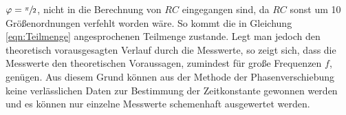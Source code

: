 $\varphi = \sfrac{\pi}{2}$, nicht in die Berechnung von $RC$ eingegangen sind, da $RC$ sonst um 10 Größenordnungen verfehlt worden wäre.
So kommt die in Gleichung \eqref{eqn:Teilmenge} angesprochenen Teilmenge zustande.
Legt man jedoch den theoretisch vorausgesagten Verlauf durch die Messwerte, so zeigt sich, dass 
die Messwerte den theoretischen Voraussagen, zumindest für große Frequenzen $f$, genügen.
Aus diesem Grund können aus der Methode der Phasenverschiebung keine verlässlichen Daten zur Bestimmung 
der Zeitkonstante gewonnen werden und es können nur einzelne Messwerte schemenhaft ausgewertet werden.
\label{sec:Diskussion}


%
